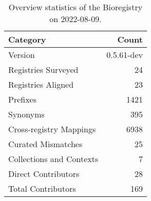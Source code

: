 \begin{table}
\centering
\caption{Overview statistics of the Bioregistry on 2022-08-09.}
\label{tab:bioregistry-summary}
\begin{tabular}{lr}
\toprule
                Category &      Count \\
\midrule
                 Version & 0.5.61-dev \\
     Registries Surveyed &         24 \\
      Registries Aligned &         23 \\
                Prefixes &       1421 \\
                Synonyms &        395 \\
 Cross-registry Mappings &       6938 \\
      Curated Mismatches &         25 \\
Collections and Contexts &          7 \\
     Direct Contributors &         28 \\
      Total Contributors &        169 \\
\bottomrule
\end{tabular}
\end{table}
